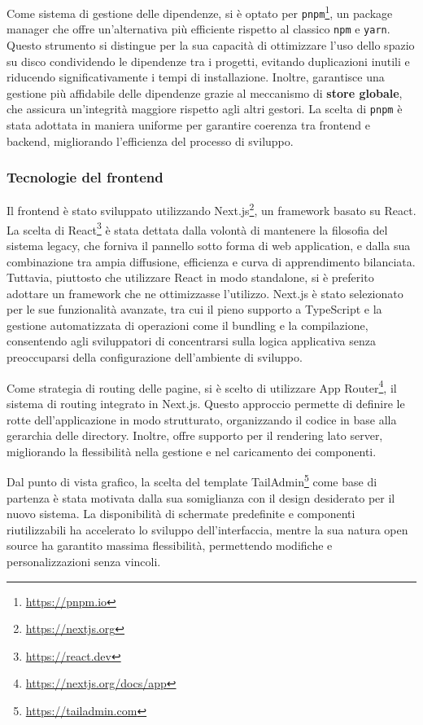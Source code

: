Come sistema di gestione delle dipendenze, si è optato per \texttt{pnpm}\footnote{\url{https://pnpm.io}}, un package manager che offre un'alternativa più efficiente rispetto al classico \texttt{npm} e \texttt{yarn}. Questo strumento si distingue per la sua capacità di ottimizzare l'uso dello spazio su disco condividendo le dipendenze tra i progetti, evitando duplicazioni inutili e riducendo significativamente i tempi di installazione. Inoltre, garantisce una gestione più affidabile delle dipendenze grazie al meccanismo di \textbf{store globale}, che assicura un'integrità maggiore rispetto agli altri gestori. La scelta di \texttt{pnpm} è stata adottata in maniera uniforme per garantire coerenza tra frontend e backend, migliorando l'efficienza del processo di sviluppo.

\subsubsection{Tecnologie del frontend}
Il frontend è stato sviluppato utilizzando Next.js\footnote{\url{https://nextjs.org}}, un framework basato su React. La scelta di React\footnote{\url{https://react.dev}} è stata dettata dalla volontà di mantenere la filosofia del sistema legacy, che forniva il pannello sotto forma di web application, e dalla sua combinazione tra ampia diffusione, efficienza e curva di apprendimento bilanciata. Tuttavia, piuttosto che utilizzare React in modo standalone, si è preferito adottare un framework che ne ottimizzasse l’utilizzo. Next.js è stato selezionato per le sue funzionalità avanzate, tra cui il pieno supporto a TypeScript e la gestione automatizzata di operazioni come il bundling e la compilazione, consentendo agli sviluppatori di concentrarsi sulla logica applicativa senza preoccuparsi della configurazione dell'ambiente di sviluppo.

Come strategia di routing delle pagine, si è scelto di utilizzare App Router\footnote{\url{https://nextjs.org/docs/app}}, il sistema di routing integrato in Next.js. Questo approccio permette di definire le rotte dell'applicazione in modo strutturato, organizzando il codice in base alla gerarchia delle directory. Inoltre, offre supporto per il rendering lato server, migliorando la flessibilità nella gestione e nel caricamento dei componenti.

Dal punto di vista grafico, la scelta del template TailAdmin\footnote{\url{https://tailadmin.com}} come base di partenza è stata motivata dalla sua somiglianza con il design desiderato per il nuovo sistema. La disponibilità di schermate predefinite e componenti riutilizzabili ha accelerato lo sviluppo dell’interfaccia, mentre la sua natura open source ha garantito massima flessibilità, permettendo modifiche e personalizzazioni senza vincoli.

